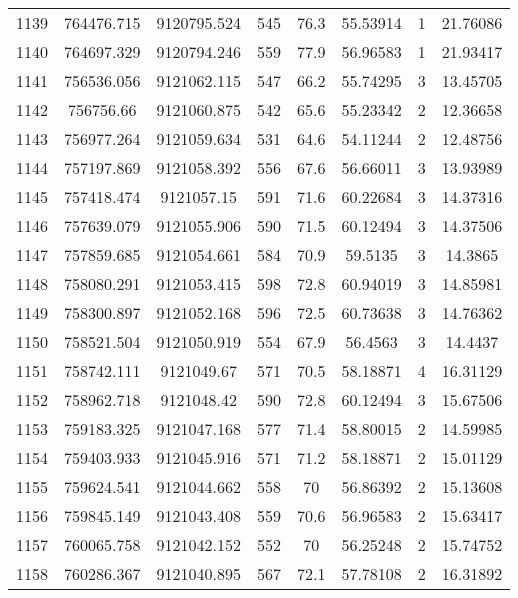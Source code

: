 \begin{longtable}{cccccccc}
1139 & 764476.715      & 9120795.524      & 545     & 76.3  & 55.53914 & 1  & 21.76086 \\
1140 & 764697.329      & 9120794.246      & 559     & 77.9  & 56.96583 & 1  & 21.93417 \\
1141 & 756536.056      & 9121062.115      & 547     & 66.2  & 55.74295 & 3  & 13.45705 \\
1142 & 756756.66       & 9121060.875      & 542     & 65.6  & 55.23342 & 2  & 12.36658 \\
1143 & 756977.264      & 9121059.634      & 531     & 64.6  & 54.11244 & 2  & 12.48756 \\
1144 & 757197.869      & 9121058.392      & 556     & 67.6  & 56.66011 & 3  & 13.93989 \\
1145 & 757418.474      & 9121057.15       & 591     & 71.6  & 60.22684 & 3  & 14.37316 \\
1146 & 757639.079      & 9121055.906      & 590     & 71.5  & 60.12494 & 3  & 14.37506 \\
1147 & 757859.685      & 9121054.661      & 584     & 70.9  & 59.5135  & 3  & 14.3865  \\
1148 & 758080.291      & 9121053.415      & 598     & 72.8  & 60.94019 & 3  & 14.85981 \\
1149 & 758300.897      & 9121052.168      & 596     & 72.5  & 60.73638 & 3  & 14.76362 \\
1150 & 758521.504      & 9121050.919      & 554     & 67.9  & 56.4563  & 3  & 14.4437  \\
1151 & 758742.111      & 9121049.67       & 571     & 70.5  & 58.18871 & 4  & 16.31129 \\
1152 & 758962.718      & 9121048.42       & 590     & 72.8  & 60.12494 & 3  & 15.67506 \\
1153 & 759183.325      & 9121047.168      & 577     & 71.4  & 58.80015 & 2  & 14.59985 \\
1154 & 759403.933      & 9121045.916      & 571     & 71.2  & 58.18871 & 2  & 15.01129 \\
1155 & 759624.541      & 9121044.662      & 558     & 70    & 56.86392 & 2  & 15.13608 \\
1156 & 759845.149      & 9121043.408      & 559     & 70.6  & 56.96583 & 2  & 15.63417 \\
1157 & 760065.758      & 9121042.152      & 552     & 70    & 56.25248 & 2  & 15.74752 \\
1158 & 760286.367      & 9121040.895      & 567     & 72.1  & 57.78108 & 2  & 16.31892 \\

\end{longtable}
